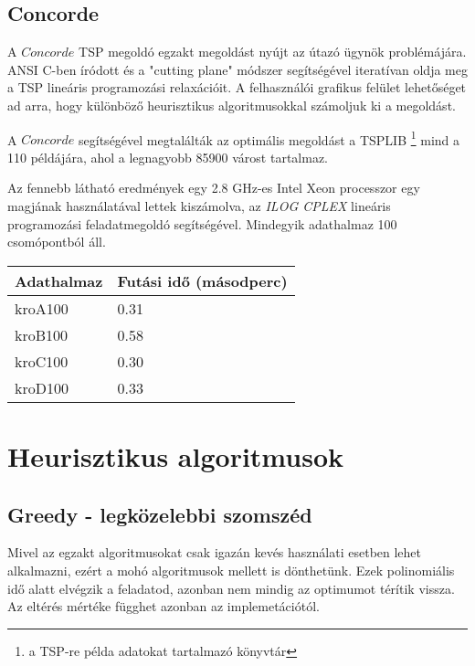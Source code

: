 \subsection{Concorde}

A \(Concorde\) TSP megoldó egzakt megoldást nyújt az útazó ügynök problémájára. ANSI C-ben íródott és a "cutting plane" módszer segítségével iteratívan oldja meg a TSP lineáris programozási relaxációit. A felhasználói grafikus felület lehetőséget ad arra, hogy különböző heurisztikus algoritmusokkal számoljuk ki a megoldást. 

A \(Concorde\) segítségével megtalálták az optimális megoldást a TSPLIB%
\footnote{ %
	a TSP-re példa adatokat tartalmazó könyvtár
}  %
mind a 110 példájára, ahol a legnagyobb 85900 várost tartalmaz.

Az fennebb látható eredmények egy 2.8 GHz-es Intel Xeon processzor egy magjának használatával lettek kiszámolva, az \textit{ILOG CPLEX} lineáris programozási feladatmegoldó segítségével. Mindegyik adathalmaz 100 csomópontból áll.

\begin{table}[]
	\begin{tabular}{l|l}
		\textbf{Adathalmaz} & \textbf{Futási idő} (másodperc) \\
		\hline
		kroA100         & 0.31  \\
		kroB100         & 0.58 \\
		kroC100         & 0.30 \\   
		kroD100         & 0.33        
	\end{tabular}
\end{table}

\section{Heurisztikus algoritmusok}\label{sec:ALAP:adatelem}

\subsection{Greedy - legközelebbi szomszéd}

Mivel az egzakt algoritmusokat csak igazán kevés használati esetben lehet alkalmazni, ezért a mohó algoritmusok mellett is dönthetünk. Ezek polinomiális idő alatt elvégzik a feladatod, azonban nem mindig az optimumot térítik vissza. Az eltérés mértéke függhet azonban az implemetációtól.


